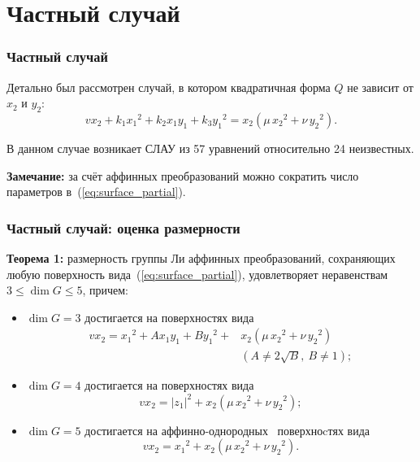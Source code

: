 \documentclass[russian,hyperref={unicode}]{beamer}
\begin{document}
\section{Частный случай}
\frame
{
	\frametitle{Частный случай}
	Детально был рассмотрен случай, в котором квадратичная форма $Q$ не зависит от $x_2$ 
   и $y_2$:
	\begin{equation}\label{eq:surface_partial}
	v x_2 + k_1 {x_1}^2 + k_2 x_1 y_1 + k_3 {y_1}^2 = x_2 (\mu\,{x_2}^2 + \nu\,{y_2}^2).
	\end{equation}

	В данном случае возникает СЛАУ из 57 уравнений относительно 24 неизвестных.
	
	\textbf{Замечание:}
	за счёт аффинных преобразований можно сократить число параметров в~(\ref{eq:surface_partial}).
}
\frame
{
	\frametitle{Частный случай: оценка размерности}
	\textbf{Теорема 1:}
	размерность группы Ли аффинных преобразований, сохраняющих любую 
	поверхность вида~(\ref{eq:surface_partial}), удовлетворяет неравенствам 
	$ 3 \le \dim G \le 5$, причем:
	\begin{itemize}
		\item $\dim G = 3$ достигается на поверхностях вида
		\begin{align}\label{eq:dim3}
			v x_2 = {x_1}^2 + A x_1 y_1 + B {y_1}^2 + &x_2 (\mu\,{x_2}^2 + \nu\, {y_2}^2) \nonumber\\
			&(A \ne 2 \sqrt{B},\ B\ne 1);
		\end{align}
		\item $\dim G = 4$ достигается на поверхностях вида
		\begin{equation}\label{eq:dim4}
			v x_2 = {|z_1|}^2 + x_2 (\mu\,{x_2}^2 + \nu\,{y_2}^2);
		\end{equation}
		\item $\dim G = 5$ достигается на аффинно-однородных~\cite{arxiv} поверхноcтях вида
		\begin{equation}\label{eq:dim5}
			v x_2 = {x_1}^2 + x_2 (\mu\,{x_2}^2 + \nu\,{y_2}^2).
		\end{equation}
	\end{itemize}
}
\frame
\end{document}
